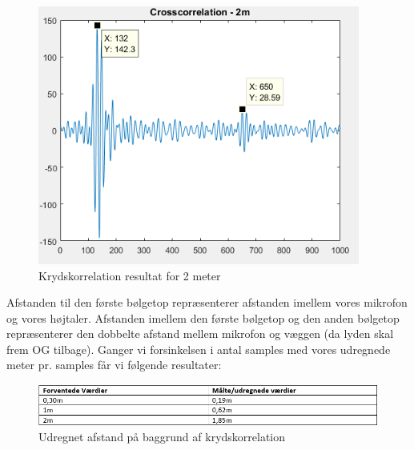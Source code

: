 \begin{figure}[H]
\centering
\includegraphics[width = 300pt]{Img/2m.PNG}
\caption{Krydskorrelation resultat for 2 meter}
\label{fig:2m}
\end{figure}

Afstanden til den første bølgetop repræsenterer afstanden imellem vores mikrofon og vores højtaler. Afstanden imellem den første bølgetop og den anden bølgetop repræsenterer den dobbelte afstand mellem mikrofon og væggen (da lyden skal frem OG tilbage). Ganger vi forsinkelsen i antal samples med vores udregnede meter pr. samples får vi følgende resultater:

\begin{figure}[H]
\centering
\includegraphics[width = 370pt]{Img/Resultater.PNG}
\caption{Udregnet afstand på baggrund af krydskorrelation}
\label{fig:Resultater}
\end{figure}


